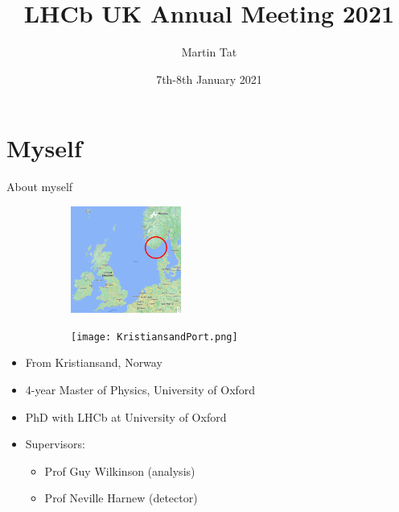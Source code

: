 \documentclass{beamer}
\title[LHCb UK Annual Meeting]{LHCb UK Annual Meeting 2021}
\author{Martin Tat}
\institute{Oxford LHCb}
\date{7th-8th January 2021}
\begin{document}
\begin{frame}
  \titlepage
\end{frame}


\section{Myself}
\begin{frame}{About myself}
  \begin{figure}
    \centering
    \begin{subfigure}{0.3\textwidth}
      \centering
      \includegraphics[width=\textwidth, height = 3.5cm]{KristiansandNorway.png}
    \end{subfigure}%
    \hspace{1cm}
    \begin{subfigure}{0.5\textwidth}
      \centering
      \texttt{[image: KristiansandPort.png]}
    \end{subfigure}
  \end{figure}
  \begin{itemize}
    \item{From Kristiansand, Norway}
    \item{4-year Master of Physics, University of Oxford}
    \item{PhD with LHCb at University of Oxford}
    \item{Supervisors:}
    \begin{itemize}
      \item{Prof Guy Wilkinson (analysis)}
      \item{Prof Neville Harnew (detector)}
    \end{itemize}
  \end{itemize}
\end{frame}
\end{document}
